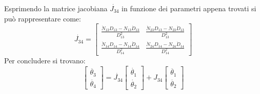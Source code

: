 Esprimendo la matrice jacobiana $\dot{J_{34}}$ in funzione dei parametri appena trovati si può rappresentare come:
\begin{equation}
    \dot{J_{34}} =
    \begin{bmatrix}
    \frac{\dot{N}_{13}D_{13}-N_{13}\dot{D}_{13}}{D_{13}^2} & 
     \frac{\dot{N}_{23}D_{13}-N_{23}\dot{D}_{13}}{D_{13}^2} \\
    \frac{\dot{N}_{14}D_{14}-N_{14}\dot{D}_{14}}{D_{14}^2} &
     \frac{\dot{N}_{24}D_{14}-N_{24}\dot{D}_{14}}{D_{14}^2}
    \end{bmatrix}
\end{equation}
Per concludere si trovano:
\begin{equation}
    \begin{bmatrix}
    \ddot{\theta_3} \\ \ddot{\theta_4}
    \end{bmatrix}
    = 
    \dot{J_{34}}\begin{bmatrix}
    \dot{\theta_1} \\ \dot{\theta_2}
    \end{bmatrix} + 
    J_{34} \begin{bmatrix}
    \ddot{\theta_1} \\ \ddot{\theta_2}
    \end{bmatrix}
\end{equation}
